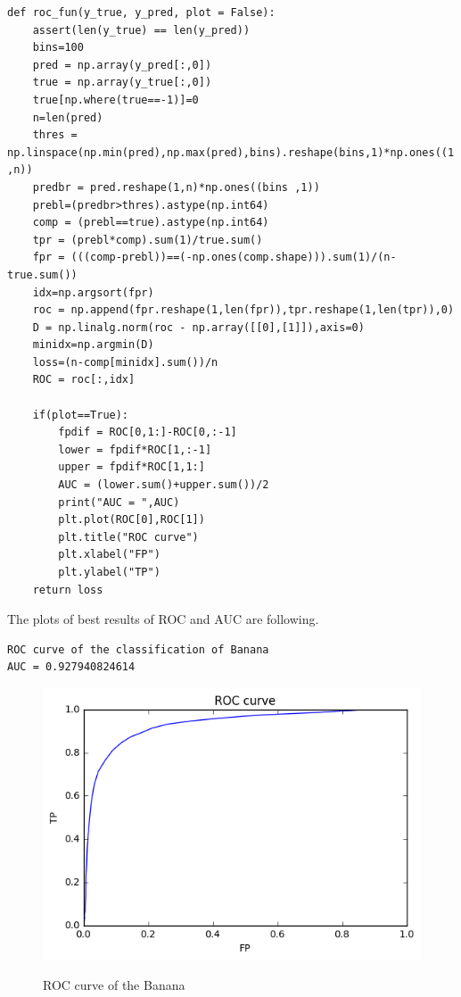 \documentclass[a4paper,11pt]{article}
\begin{document}
\begin{verbatim}
def roc_fun(y_true, y_pred, plot = False):
    assert(len(y_true) == len(y_pred))
    bins=100
    pred = np.array(y_pred[:,0])
    true = np.array(y_true[:,0])
    true[np.where(true==-1)]=0
    n=len(pred)
    thres = np.linspace(np.min(pred),np.max(pred),bins).reshape(bins,1)*np.ones((1 ,n))
    predbr = pred.reshape(1,n)*np.ones((bins ,1))
    prebl=(predbr>thres).astype(np.int64)
    comp = (prebl==true).astype(np.int64)
    tpr = (prebl*comp).sum(1)/true.sum()
    fpr = (((comp-prebl))==(-np.ones(comp.shape))).sum(1)/(n-true.sum())
    idx=np.argsort(fpr)
    roc = np.append(fpr.reshape(1,len(fpr)),tpr.reshape(1,len(tpr)),0)
    D = np.linalg.norm(roc - np.array([[0],[1]]),axis=0)
    minidx=np.argmin(D)
    loss=(n-comp[minidx].sum())/n
    ROC = roc[:,idx]
    
    if(plot==True):
        fpdif = ROC[0,1:]-ROC[0,:-1]
        lower = fpdif*ROC[1,:-1]
        upper = fpdif*ROC[1,1:]
        AUC = (lower.sum()+upper.sum())/2
        print("AUC = ",AUC)
        plt.plot(ROC[0],ROC[1])
        plt.title("ROC curve")
        plt.xlabel("FP")
        plt.ylabel("TP")
    return loss 
\end{verbatim}

The plots of best results of ROC and AUC are following.

\begin{verbatim}
ROC curve of the classification of Banana 
AUC = 0.927940824614
\end{verbatim}

\begin{figure}[htbp]
 \centering 
  \includegraphics[scale=0.7]{rocbg.png}\\
    \caption{ROC curve of the Banana}
\end{figure}
\end{document}
